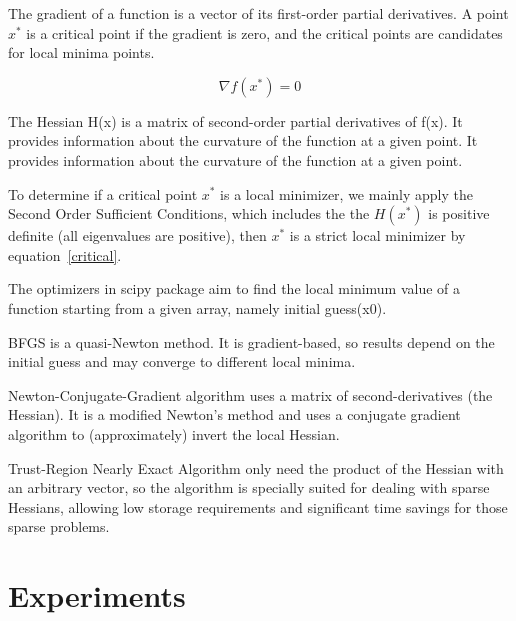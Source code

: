 \documentclass[12pt]{article}
\begin{document}
The gradient of a function is a vector of its first-order partial derivatives. A point $x^*$ is a critical point if the gradient is zero, and the critical points are candidates for local minima points.

\begin{equation}
\nabla f(x^*) = 0
\label{critical}
\end{equation}

The Hessian H(x) is a matrix of second-order partial derivatives of f(x). It provides information about the curvature of the function at a given point. It provides information about the curvature of the function at a given point.

To determine if a critical point $x^*$ is a local minimizer, we mainly apply the Second Order Sufficient Conditions, which includes the the $H(x^*)$ is positive definite (all eigenvalues are positive), then $x^*$ is a strict local minimizer by equation~\ref{critical}.

The optimizers in scipy package aim to find the local minimum value of a function starting from a given array, namely initial guess(x0).  \cite{scipy} %

BFGS is a quasi-Newton method. It is gradient-based, so results depend on the initial guess and may converge to different local minima.  \cite{scipybfgs}%

Newton-Conjugate-Gradient algorithm uses a matrix of second-derivatives (the Hessian). It is a modified Newton’s method and uses a conjugate gradient algorithm to (approximately) invert the local Hessian.  \cite{scipynewton}%

Trust-Region Nearly Exact Algorithm only need the product of the Hessian with an arbitrary vector, so the algorithm is specially suited for dealing with sparse Hessians, allowing low storage requirements and significant time savings for those sparse problems.  \cite{scipytrust}%

\section{Experiments}
\end{document}

